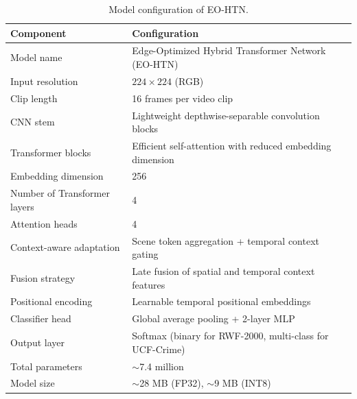 \documentclass[AMA,Times1COL]{WileyNJDv5} %
\begin{document}
\begin{table}[t]
\centering
\caption{Model configuration of EO-HTN.}
\label{tab:model_config_eohtn}
\renewcommand{\arraystretch}{1.1}
\setlength{\tabcolsep}{3.5pt}
\begin{tabular}{|p{3.5cm}|p{7.2cm}|}
\hline
\textbf{Component} & \textbf{Configuration} \\
\hline
Model name & Edge-Optimized Hybrid Transformer Network (EO-HTN) \\
\hline
Input resolution & $224 \times 224$ (RGB) \\
\hline
Clip length & 16 frames per video clip \\
\hline
CNN stem & Lightweight depthwise-separable convolution blocks \\
\hline
Transformer blocks & Efficient self-attention with reduced embedding dimension \\
\hline
Embedding dimension & 256 \\
\hline
Number of Transformer layers & 4 \\
\hline
Attention heads & 4 \\
\hline
Context-aware adaptation & Scene token aggregation + temporal context gating \\
\hline
Fusion strategy & Late fusion of spatial and temporal context features \\
\hline
Positional encoding & Learnable temporal positional embeddings \\
\hline
Classifier head & Global average pooling + 2-layer MLP \\
\hline
Output layer & Softmax (binary for RWF-2000, multi-class for UCF-Crime) \\
\hline
Total parameters & $\sim$7.4 million \\
\hline
Model size & $\sim$28 MB (FP32), $\sim$9 MB (INT8) \\
\hline
\end{tabular}%
\end{table}
\end{document}
